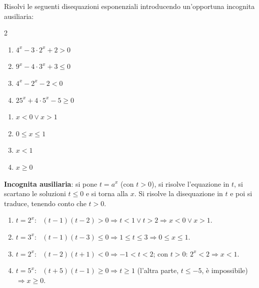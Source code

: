 
\begin{question}[ID=5.6, subtitle={Disequazioni con sostituzione: trinomi in $a^x$}, difficulty=media, tags={disequazioni, esponenziali, sostituzione}]
Risolvi le seguenti disequazioni esponenziali introducendo un'opportuna incognita ausiliaria:
\begin{center}\begin{minipage}{0.92\linewidth}
\begin{multicols}{2}
\begin{enumerate}[leftmargin=3.2cm]
\item $4^{x} - 3 \cdot 2^{x} + 2 > 0$
\item $9^{x} - 4 \cdot 3^{x} + 3 \leq 0$
\item $4^{x} - 2^{x} - 2 < 0$
\item $25^{x} + 4 \cdot 5^{x} - 5 \geq 0$
\end{enumerate}
\end{multicols}
\end{minipage}\end{center}
\begin{solution}
\begin{enumerate}
    \item $x<0\vee x>1$
    \item $0\leq x\leq1$
    \item $x<1$
    \item $x\geq0$
\end{enumerate}
\end{solution}
\begin{explanation}
\textbf{Incognita ausiliaria}: si pone $t=a^x$ (con $t>0$), si risolve l'equazione in $t$, si scartano le soluzioni $t\leq0$ e si torna alla $x$.
Si risolve la disequazione in $t$ e poi si traduce, tenendo conto che $t>0$.
\begin{enumerate}
    \item $t=2^x$: \ $(t-1)(t-2)>0 \Rightarrow t<1 \vee t>2 \Rightarrow x<0 \vee x>1$.
    \item $t=3^x$: \ $(t-1)(t-3)\leq0 \Rightarrow 1\leq t\leq3 \Rightarrow 0\leq x\leq1$.
    \item $t=2^x$: \ $(t-2)(t+1)<0 \Rightarrow -1<t<2$; con $t>0$: $2^x<2 \Rightarrow x<1$.
    \item $t=5^x$: \ $(t+5)(t-1)\geq0 \Rightarrow t\geq1$ (l'altra parte, $t\leq-5$, è impossibile) $\Rightarrow x\geq0$.
\end{enumerate}
\end{explanation}
\end{question}

